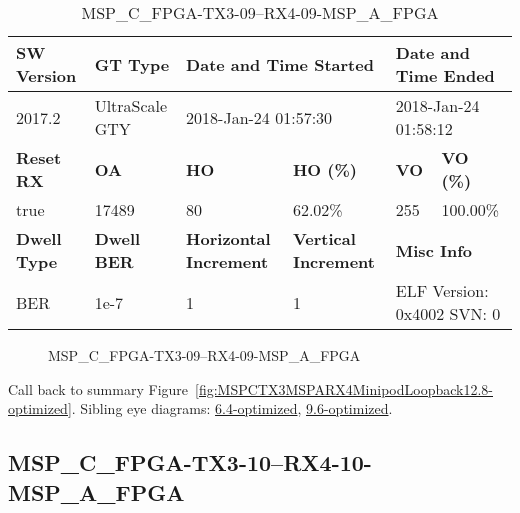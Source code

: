\begin{table}[h]
\centering
\caption{MSP\_C\_FPGA-TX3-09--RX4-09-MSP\_A\_FPGA}
\label{tab:MSPCFPGATX309RX409MSPAFPGA12.8-optimized}
\begin{tabular}{@{}|l|l|l|l|l|l|@{}}
\toprule
\textbf{SW Version}                & \textbf{GT Type}   & \multicolumn{2}{l|}{\textbf{Date and Time Started}}            & \multicolumn{2}{l|}{\textbf{Date and Time Ended}}        \\ \midrule
2017.2                       & UltraScale GTY          & \multicolumn{2}{l|}{2018-Jan-24 01:57:30}                   & \multicolumn{2}{l|}{2018-Jan-24 01:58:12}               \\ \midrule
\textbf{Reset RX}                  & \textbf{OA} & \textbf{HO}   & \textbf{HO (\%)} & \textbf{VO} & \textbf{VO (\%)} \\ \midrule
true & 17489        & 80          & 62.02\%        & 255        & 100.00\%       \\ \midrule
\textbf{Dwell Type}                & \textbf{Dwell BER} & \textbf{Horizontal Increment} & \textbf{Vertical Increment}    & \multicolumn{2}{l|}{\textbf{Misc Info}}                  \\ \midrule
BER                            & 1e-7        & 1        & 1           & \multicolumn{2}{l|}{ELF Version: 0x4002 SVN: 0}                         \\ \bottomrule
\end{tabular}
\end{table}

\begin{figure}[h]
\caption{MSP\_C\_FPGA-TX3-09--RX4-09-MSP\_A\_FPGA} \label{fig:MSPCFPGATX309RX409MSPAFPGA12.8-optimized}
\end{figure}

Call back to summary Figure~\ref{fig:MSPCTX3MSPARX4MinipodLoopback12.8-optimized}.
Sibling eye diagrams: \hyperref[sec:MSPCFPGATX309RX409MSPAFPGA6.4-optimized]{6.4-optimized}, \hyperref[sec:MSPCFPGATX309RX409MSPAFPGA9.6-optimized]{9.6-optimized}.

\clearpage
\newpage


\subsection{MSP\_C\_FPGA-TX3-10--RX4-10-MSP\_A\_FPGA}\label{sec:MSPCFPGATX310RX410MSPAFPGA12.8-optimized}

